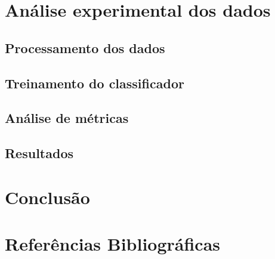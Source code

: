 \documentclass{article}
\begin{document}
\section{Análise experimental dos dados}

\subsection{Processamento dos dados}

\subsection{Treinamento do classificador}

\subsection{Análise de métricas}

\subsection{Resultados}

\section{Conclusão}

\section{Referências Bibliográficas}
\end{document}
